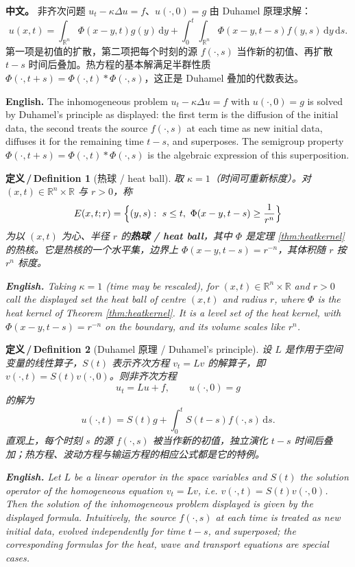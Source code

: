 \documentclass[UTF8,11pt,a4paper]{ctexart}
\newcommand{\APS}[2]{\par\noindent\textbf{中文。} #1\par\noindent\textbf{English.} #2\par\smallskip}
\newcommand{\EN}[1]{\par\noindent \textbf{English.} #1\par}
\newtheorem{definition}{定义\,/\,Definition}[section]
\newcommand{\R}{\mathbb{R}}
\newcommand{\dd}{\mathrm{d}}
\begin{document}
\APS{非齐次问题 $u_t-\kappa\Delta u=f$、$u(\cdot,0)=g$ 由 Duhamel 原理求解：
\[
u(x,t)=\int_{\R^n}\Phi(x-y,t)g(y)\,\dd y+\int_0^t\!\!\int_{\R^n}\Phi(x-y,t-s)f(y,s)\,\dd y\,\dd s .
\]
第一项是初值的扩散，第二项把每个时刻的源 $f(\cdot,s)$ 当作新的初值、再扩散 $t-s$ 时间后叠加。热方程的基本解满足半群性质 $\Phi(\cdot,t+s)=\Phi(\cdot,t)*\Phi(\cdot,s)$，这正是 Duhamel 叠加的代数表达。}{The inhomogeneous problem $u_t-\kappa\Delta u=f$ with $u(\cdot,0)=g$ is solved by Duhamel's principle as displayed: the first term is the diffusion of the initial data, the second treats the source $f(\cdot,s)$ at each time as new initial data, diffuses it for the remaining time $t-s$, and superposes. The semigroup property $\Phi(\cdot,t+s)=\Phi(\cdot,t)*\Phi(\cdot,s)$ is the algebraic expression of this superposition.}

\begin{definition}[热球 / heat ball]\label{def:heatball}
取 $\kappa=1$（时间可重新标度）。对 $(x,t)\in\R^n\times\R$ 与 $r>0$，称
\[
E(x,t;r)=\Bigl\{(y,s):\ s\le t,\ \Phi(x-y,t-s)\ge\frac{1}{r^n}\Bigr\}
\]
为以 $(x,t)$ 为心、半径 $r$ 的\textbf{热球 / heat ball}，其中 $\Phi$ 是定理 \ref{thm:heatkernel} 的热核。它是热核的一个水平集，边界上 $\Phi(x-y,t-s)=r^{-n}$，其体积随 $r$ 按 $r^n$ 标度。
\EN{Taking $\kappa=1$ (time may be rescaled), for $(x,t)\in\R^n\times\R$ and $r>0$ call the displayed set the heat ball of centre $(x,t)$ and radius $r$, where $\Phi$ is the heat kernel of Theorem \ref{thm:heatkernel}. It is a level set of the heat kernel, with $\Phi(x-y,t-s)=r^{-n}$ on the boundary, and its volume scales like $r^n$.}
\end{definition}

\begin{definition}[Duhamel 原理 / Duhamel's principle]\label{def:duhamel}
设 $L$ 是作用于空间变量的线性算子，$S(t)$ 表示齐次方程 $v_t=Lv$ 的解算子，即 $v(\cdot,t)=S(t)v(\cdot,0)$。则非齐次方程
\[
u_t=Lu+f,\qquad u(\cdot,0)=g
\]
的解为
\[
u(\cdot,t)=S(t)g+\int_0^tS(t-s)f(\cdot,s)\,\dd s .
\]
直观上，每个时刻 $s$ 的源 $f(\cdot,s)$ 被当作新的初值，独立演化 $t-s$ 时间后叠加；热方程、波动方程与输运方程的相应公式都是它的特例。
\EN{Let $L$ be a linear operator in the space variables and $S(t)$ the solution operator of the homogeneous equation $v_t=Lv$, i.e. $v(\cdot,t)=S(t)v(\cdot,0)$. Then the solution of the inhomogeneous problem displayed is given by the displayed formula. Intuitively, the source $f(\cdot,s)$ at each time is treated as new initial data, evolved independently for time $t-s$, and superposed; the corresponding formulas for the heat, wave and transport equations are special cases.}
\end{definition}
\end{document}
